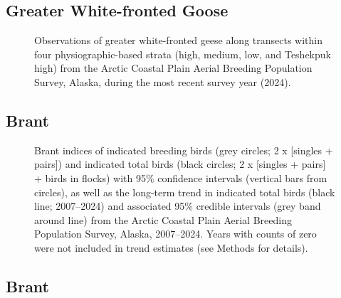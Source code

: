 \documentclass[
]{article}
\begin{document}
\endgroup{}

\newpage{}

\subsection*{Greater White-fronted
Goose}\label{greater-white-fronted-goose-2}

\begin{figure}


\caption{\label{fig-GWFGmap}Observations of greater white-fronted geese
along transects within four physiographic-based strata (high, medium,
low, and Teshekpuk high) from the Arctic Coastal Plain Aerial Breeding
Population Survey, Alaska, during the most recent survey year (2024).}

\end{figure}%

\newpage{}

\subsection*{Brant}\label{brant}

\begin{figure}


\caption{\label{fig-BRAN}Brant indices of indicated breeding birds (grey
circles; 2 x {[}singles + pairs{]}) and indicated total birds (black
circles; 2 x {[}singles + pairs{]} + birds in flocks) with 95\%
confidence intervals (vertical bars from circles), as well as the
long-term trend in indicated total birds (black line; 2007--2024) and
associated 95\% credible intervals (grey band around line) from the
Arctic Coastal Plain Aerial Breeding Population Survey, Alaska,
2007--2024. Years with counts of zero were not included in trend
estimates (see Methods for details).}

\end{figure}%

\newpage{}

\subsection*{Brant}\label{brant-1}
\end{document}
